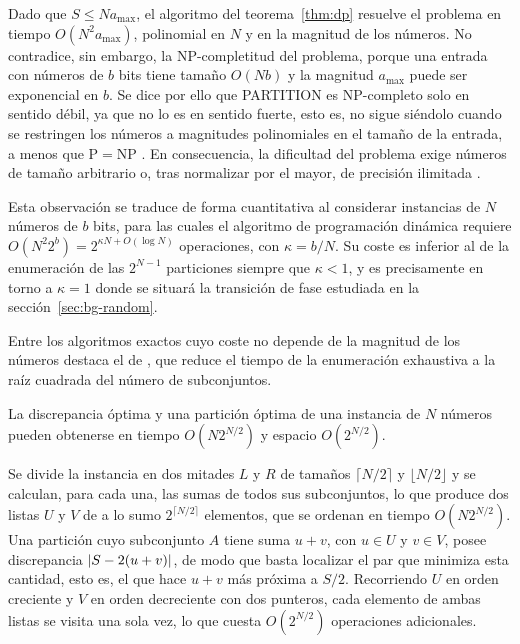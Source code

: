 Dado que $S \leq N a_{\max}$, el algoritmo del teorema~\ref{thm:dp} resuelve el problema en tiempo $O(N^2 a_{\max})$, polinomial en $N$ y en la magnitud de los números. No contradice, sin embargo, la NP-completitud del problema, porque una entrada con números de $b$ bits tiene tamaño $O(Nb)$ y la magnitud $a_{\max}$ puede ser exponencial en $b$. Se dice por ello que PARTITION es NP-completo solo en sentido débil, ya que no lo es en sentido fuerte, esto es, no sigue siéndolo cuando se restringen los números a magnitudes polinomiales en el tamaño de la entrada, a menos que $\mathrm{P} = \mathrm{NP}$ \parencite{garey1979,gent1998}. En consecuencia, la dificultad del problema exige números de tamaño arbitrario o, tras normalizar por el mayor, de precisión ilimitada \parencite{mertens2001}.

Esta observación se traduce de forma cuantitativa al considerar instancias de $N$ números de $b$ bits, para las cuales el algoritmo de programación dinámica requiere $O(N^2 2^b) = 2^{\kappa N + O(\log N)}$ operaciones, con $\kappa = b/N$. Su coste es inferior al de la enumeración de las $2^{N-1}$ particiones siempre que $\kappa < 1$, y es precisamente en torno a $\kappa = 1$ donde se situará la transición de fase estudiada en la sección~\ref{sec:bg-random}.

Entre los algoritmos exactos cuyo coste no depende de la magnitud de los números destaca el de \textcite{horowitz1974}, que reduce el tiempo de la enumeración exhaustiva a la raíz cuadrada del número de subconjuntos.

\begin{theorem}\label{thm:hs}
La discrepancia óptima y una partición óptima de una instancia de $N$ números pueden obtenerse en tiempo $O(N 2^{N/2})$ y espacio $O(2^{N/2})$.
\end{theorem}

\begin{demostracion}
Se divide la instancia en dos mitades $L$ y $R$ de tamaños $\lceil N/2 \rceil$ y $\lfloor N/2 \rfloor$ y se calculan, para cada una, las sumas de todos sus subconjuntos, lo que produce dos listas $U$ y $V$ de a lo sumo $2^{\lceil N/2 \rceil}$ elementos, que se ordenan en tiempo $O(N 2^{N/2})$. Una partición cuyo subconjunto $A$ tiene suma $u + v$, con $u \in U$ y $v \in V$, posee discrepancia $\left\lvert S - 2(u + v) \right\rvert$, de modo que basta localizar el par que minimiza esta cantidad, esto es, el que hace $u + v$ más próxima a $S/2$. Recorriendo $U$ en orden creciente y $V$ en orden decreciente con dos punteros, cada elemento de ambas listas se visita una sola vez, lo que cuesta $O(2^{N/2})$ operaciones adicionales.
\end{demostracion}

